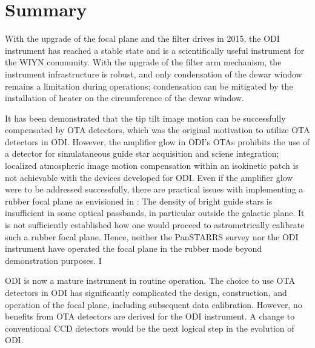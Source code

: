 \documentclass[]{spieman}
\begin{document}
\section{Summary}

With the upgrade of the focal plane and the filter drives in 2015, the ODI
instrument has reached a stable state and is a scientifically useful instrument
for the WIYN community. With the upgrade of the filter arm mechanism, the
instrument infrastructure is robust, and only condensation of the dewar window
remains a limitation during  operations; condensation can be mitigated by the 
installation of heater on the circumference of the dewar window.

It has been demonstrated  that the tip tilt image motion can be
successfully compensated by OTA detectors, which was the original motivation to 
utilize OTA detectors in ODI.  However, the amplifier glow in ODI's OTAs 
prohibits the use of a detector for simulataneous guide star acquisition and 
sciene integration; localized atmospheric image motion compensation within an 
isokinetic patch is not achievable with the devices developed for ODI. Even 
if the amplifier glow were to be addressed
successfully, there are practical issues with implementing a rubber focal plane
as envisioned in \cite{tonry2002}: The density of  bright guide stars is
insufficient in some  optical passbands, in particular outside the galactic
plane. It is not sufficiently established how one would proceed to
astrometrically calibrate such a rubber focal plane.  Hence, neither the 
PanSTARRS survey nor the ODI instrument have operated the focal plane in the 
rubber mode beyond demonstration purposes.  I

ODI is now a mature instrument in routine operation. The choice to use  OTA 
detectors in ODI has significantly complicated the design, construction, and 
operation of the focal plane, including subsequent data calibration. However, 
no benefits from OTA detectors are derived for the ODI instrument. A change to 
conventional CCD detectors would be the next logical step in the evolution of 
ODI.
 
 

\end{document}

